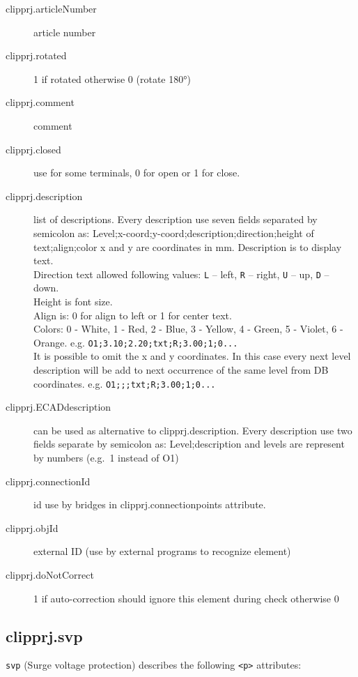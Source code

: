 \documentclass[%
	a4paper,
	oneside,
	listof=numbered,
	parskip=half,
	headsepline=true,
	footsepline=false,
	0.7headlines,
	]{scrbook}
\begin{document}
\begin{description}
	\item[clipprj.articleNumber] article number 
	\item[clipprj.rotated] 1 if rotated otherwise 0 (rotate 180°) 
	\item[clipprj.comment] comment 
	\item[clipprj.closed] use for some terminals, 0 for open or 1 for close. 
	\item[clipprj.description] list of descriptions.
	Every description use seven fields separated by semicolon as: Level;x-coord;y-coord;description;direction;height of text;align;color x and y are coordinates in mm.
	Description is to display text.\\
	Direction text allowed following values: 
	\verb|L| – left, \verb|R| – right, \verb|U| – up, \verb|D| – down.\\
	Height is font size.\\
	Align is: 0 for align to left or 1 for center text.\\
	Colors: 0 - White, 1 - Red, 2 - Blue, 3 - Yellow, 4 - Green, 5 - Violet, 6 - Orange.
	e.g. \verb|O1;3.10;2.20;txt;R;3.00;1;0...|\\
	It is possible to omit the x and y coordinates.
	In this case every next level description will be add to next occurrence of the same level from DB coordinates.
	e.g. \verb|O1;;;txt;R;3.00;1;0...|
	\item[clipprj.ECADdescription] can be used as alternative to clipprj.description.
	Every description use two fields separate by semicolon as: Level;description and levels are represent by numbers (e.g.\ 1 instead of O1)
	\item[clipprj.connectionId] id use by bridges in clipprj.connectionpoints attribute. 
	\item[clipprj.objId] external ID (use by external programs to recognize element) 
	\item[clipprj.doNotCorrect] 1 if auto-correction should ignore this element during check otherwise 0 
\end{description}

\subsection{clipprj.svp}
 
\verb|svp| (Surge voltage protection) describes the following \verb|<p>| attributes: 
\end{document}
